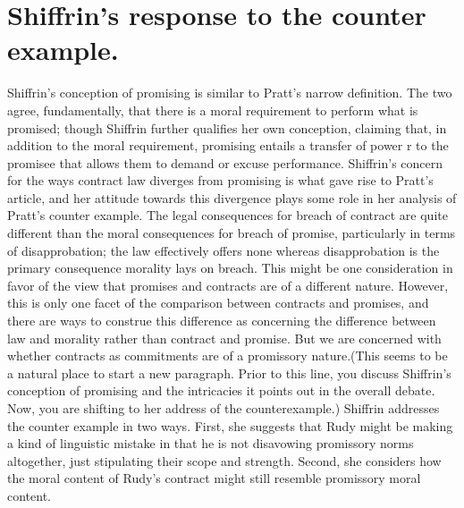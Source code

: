 \section{Shiffrin's response to the counter example.}

Shiffrin's conception of promising is similar to Pratt's narrow
definition. The two agree, fundamentally, that there is a moral
requirement to perform what is promised; though Shiffrin further
qualifies her own conception, claiming that, in addition to the moral
requirement, promising entails a transfer of power r to the promisee
that allows them to demand or excuse performance. Shiffrin's concern for
the ways contract law diverges from promising is what gave rise to
Pratt's article, and her attitude towards this divergence plays some
role in her analysis of Pratt's counter example. The legal consequences
for breach of contract are quite different than the moral consequences
for breach of promise, particularly in terms of disapprobation; the law
effectively offers none whereas disapprobation is the primary
consequence morality lays on breach. This might be one consideration in
favor of the view that promises and contracts are of a different nature.
However, this is only one facet of the comparison between contracts and
promises, and there are ways to construe this difference as concerning
the difference between law and morality rather than contract and
promise. But we are concerned with whether contracts as commitments are
of a promissory nature.(This seems to be a natural place to start a new
paragraph. Prior to this line, you discuss Shiffrin's conception of
promising and the intricacies it points out in the overall debate. Now,
you are shifting to her address of the counterexample.) Shiffrin
addresses the counter example in two ways. First, she suggests that Rudy
might be making a kind of linguistic mistake in that he is not
disavowing promissory norms altogether, just stipulating their scope and
strength. Second, she considers how the moral content of Rudy's contract
might still resemble promissory moral content.

